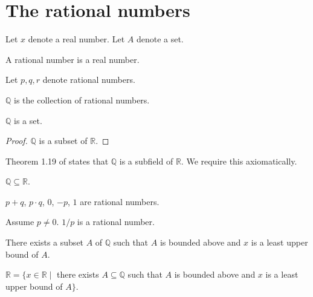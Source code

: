 \documentclass{article}
\begin{document}
\section{The rational numbers}

\begin{forthel}
Let $x$ denote a real number.
Let $A$ denote a set.

\begin{signature}[1 19a]
A rational number is a real number.
\end{signature}

Let $p,q,r$ denote rational numbers.

\begin{definition}
$\mathbb{Q}$ is the collection of rational numbers.
\end{definition}

\begin{theorem}
$\mathbb{Q}$ is a set.
\end{theorem}
\begin{proof}
$\mathbb{Q}$ is a subset of $\mathbb{R}$.
\end{proof}

\end{forthel}


Theorem 1.19 of \cite{Rudin1953} states that $\mathbb{Q}$ is a
subfield of $\mathbb{R}$. We require this axiomatically.


\begin{forthel}

\begin{lemma}
$\mathbb{Q} \subseteq \mathbb{R}$.
\end{lemma}

\begin{axiom}
$p + q$, $p \cdot q$, $0$, $-p$, $1$ are rational numbers.
\end{axiom}

\begin{axiom}
Assume $p \neq 0$.
$1/p$ is a rational number.
\end{axiom}

\begin{axiom}
There exists a subset $A$ of $\mathbb{Q}$
such that $A$ is bounded above and
$x$ is a least upper bound of $A$.
\end{axiom}

\begin{theorem}
$\mathbb{R} = \{x \in \mathbb{R} \mid$ there exists $
A \subseteq \mathbb{Q}$ such that $
A$ is bounded above and $x$ is a least upper
bound of $A\}$.
\end{theorem}

\end{forthel}
\end{document}
